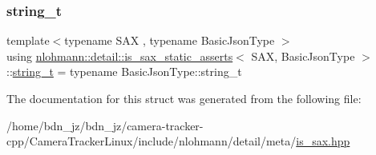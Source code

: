 \mbox{\label{structnlohmann_1_1detail_1_1is__sax__static__asserts_a067c98d2145bb54d862f4794ac1287bb}} 
\subsubsection{\texorpdfstring{string\+\_\+t}{string\_t}}
{\footnotesize\ttfamily template$<$typename S\+AX , typename Basic\+Json\+Type $>$ \\
using \hyperlink{structnlohmann_1_1detail_1_1is__sax__static__asserts}{nlohmann\+::detail\+::is\+\_\+sax\+\_\+static\+\_\+asserts}$<$ S\+AX, Basic\+Json\+Type $>$\+::\hyperlink{structnlohmann_1_1detail_1_1is__sax__static__asserts_a067c98d2145bb54d862f4794ac1287bb}{string\+\_\+t} =  typename Basic\+Json\+Type\+::string\+\_\+t\hspace{0.3cm}{\ttfamily [private]}}



The documentation for this struct was generated from the following file\+:\begin{DoxyCompactItemize}
\item 
/home/bdn\+\_\+jz/bdn\+\_\+jz/camera-\/tracker-\/cpp/\+Camera\+Tracker\+Linux/include/nlohmann/detail/meta/\hyperlink{is__sax_8hpp}{is\+\_\+sax.\+hpp}\end{DoxyCompactItemize}
